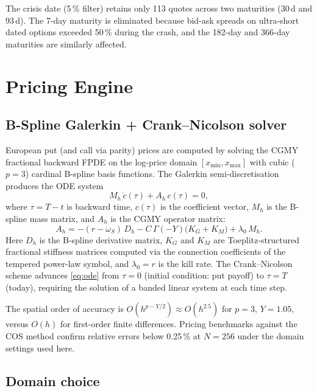 \documentclass[11pt,a4paper]{article}
\begin{document}
The crisis date (5\,\% filter) retains only 113 quotes across two maturities
(30\,d and 93\,d).  The 7-day maturity is eliminated because bid-ask spreads
on ultra-short dated options exceeded 50\,\% during the crash, and the 182-day
and 366-day maturities are similarly affected.

\section{Pricing Engine}
\label{sec:pricing}

\subsection{B-Spline Galerkin + Crank--Nicolson solver}

European put (and call via parity) prices are computed by solving the CGMY
fractional backward FPDE on the log-price domain $[x_{\min}, x_{\max}]$
with cubic ($p=3$) cardinal B-spline basis functions.
The Galerkin semi-discretisation produces the ODE system
\begin{equation}
  M_h\,\dot{c}(\tau) + A_h\,c(\tau) = 0,
  \label{eq:ode}
\end{equation}
where $\tau = T - t$ is backward time, $c(\tau)$ is the coefficient vector,
$M_h$ is the B-spline mass matrix, and $A_h$ is the CGMY operator matrix:
\[
  A_h = -(r-\omega_S)\,D_h
        - C\,\Gamma(-Y)\bigl(K_G + K_M\bigr)
        + \lambda_0\,M_h.
\]
Here $D_h$ is the B-spline derivative matrix,
$K_G$ and $K_M$ are Toeplitz-structured fractional stiffness matrices
computed via the connection coefficients of the tempered power-law symbol,
and $\lambda_0 = r$ is the kill rate.
The Crank--Nicolson scheme advances \eqref{eq:ode} from $\tau=0$
(initial condition: put payoff) to $\tau=T$ (today), requiring the solution
of a banded linear system at each time step.

The spatial order of accuracy is $O(h^{p-Y/2}) \approx O(h^{2.5})$ for
$p=3$, $Y=1.05$, versus $O(h)$ for first-order finite differences.
Pricing benchmarks against the COS method confirm relative errors below
0.25\,\% at $N=256$ under the domain settings used here.

\subsection{Domain choice}
\end{document}
